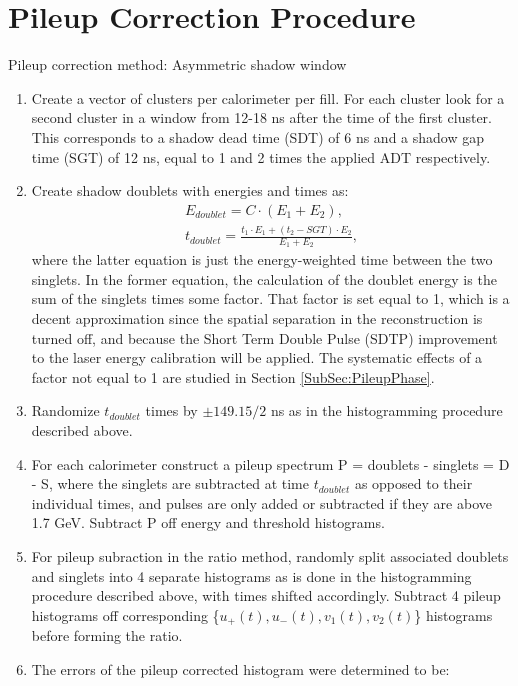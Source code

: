\section{Pileup Correction Procedure}
\label{Sec:PileupCorrection}

	Pileup correction method: Asymmetric shadow window

	\begin{enumerate}
		\item{Create a vector of clusters per calorimeter per fill. For each cluster look for a second cluster in a window from 12-18 ns after the time of the first cluster. This corresponds to a shadow dead time (SDT) of 6 ns and a shadow gap time (SGT) of 12 ns, equal to 1 and 2 times the applied ADT respectively.}
		\item{Create shadow doublets with energies and times as:
			\begin{gather}
				E_{doublet} = C \cdot (E_{1} + E_{2}), \\
				t_{doublet} = \frac{t_{1} \cdot E_{1} + (t_{2}-SGT) \cdot E_{2}}{E_{1} + E_{2}},
			\end{gather}
		where the latter equation is just the energy-weighted time between the two singlets. In the former equation, the calculation of the doublet energy is the sum of the singlets times some factor. That factor is set equal to 1, which is a decent approximation since the spatial separation in the reconstruction is turned off, and because the Short Term Double Pulse (SDTP) improvement to the laser energy calibration will be applied. The systematic effects of a factor not equal to 1 are studied in Section \ref{SubSec:PileupPhase}.}
		\item{Randomize $t_{doublet}$ times by $\pm 149.15/2$ ns as in the histogramming procedure described above.}
		\item{For each calorimeter construct a pileup spectrum P = doublets - singlets = D - S, where the singlets are subtracted at time $t_{doublet}$ as opposed to their individual times, and pulses are only added or subtracted if they are above 1.7 GeV. Subtract P off energy and threshold histograms.}
		\item{For pileup subraction in the ratio method, randomly split associated doublets and singlets into 4 separate histograms as is done in the histogramming procedure described above, with times shifted accordingly. Subtract 4 pileup histograms off corresponding \{$u_{+}(t), u_{-}(t), v_{1}(t), v_{2}(t)$\} histograms before forming the ratio.}
		\item{The errors of the pileup corrected histogram were determined to be: 
}
\end{enumerate}
